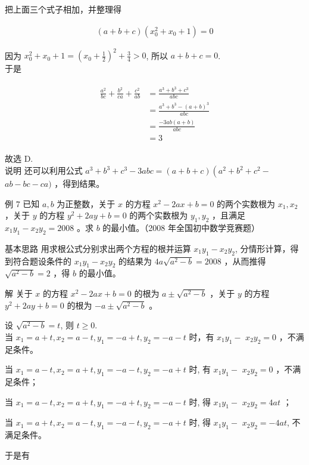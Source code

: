 \documentclass[10pt]{article}
\begin{document}
把上面三个式子相加，并整理得

\begin{align*}
(a+b+c)\left(x_{0}^{2}+x_{0}+1\right)=0
\end{align*}

因为 $x_{0}^{2}+x_{0}+1=\left(x_{0}+\frac{1}{2}\right)^{2}+\frac{3}{4}>0$, 所以 $a+b+c=0$.\\
于是

\begin{align*}
\begin{aligned}
\frac{a^{2}}{b c}+\frac{b^{2}}{c a}+\frac{c^{2}}{a b} & =\frac{a^{3}+b^{3}+c^{3}}{a b c} \\
& =\frac{a^{3}+b^{3}-(a+b)^{3}}{a b c} \\
& =\frac{-3 a b(a+b)}{a b c} \\
& =3
\end{aligned}
\end{align*}

故选 D.\\
说明 还可以利用公式 $a^{3}+b^{3}+c^{3}-3 a b c=(a+b+c)\left(a^{2}+b^{2}+c^{2}-\right.$ $a b-b c-c a)$ ，得到结果。

例 7 已知 $a, b$ 为正整数，关于 $x$ 的方程 $x^{2}-2 a x+b=0$ 的两个实数根为 $x_{1}, x_{2}$ ，关于 $y$ 的方程 $y^{2}+2 a y+b=0$ 的两个实数根为 $y_{1}, y_{2}$ ，且满足 $x_{1} y_{1}-x_{2} y_{2}=2008$ 。求 $b$ 的最小值。（2008 年全国初中数学竞赛题）

基本思路 用求根公式分别求出两个方程的根并运算 $x_{1} y_{1}-x_{2} y_{2}$, 分情形计算，得到符合题设条件的 $x_{1} y_{1}-x_{2} y_{2}$ 的结果为 $4 a \sqrt{a^{2}-b}=2008$ ，从而推得 $\sqrt{a^{2}-b}=2$ ，得 $b$ 的最小值。

解 关于 $x$ 的方程 $x^{2}-2 a x+b=0$ 的根为 $a \pm \sqrt{a^{2}-b}$ ，关于 $y$ 的方程 $y^{2}+2 a y+b=0$ 的根为 $-a \pm \sqrt{a^{2}-b}$ 。

设 $\sqrt{a^{2}-b}=t$, 则 $t \geqslant 0$.\\
当 $x_{1}=a+t, x_{2}=a-t, y_{1}=-a+t, y_{2}=-a-t$ 时，有 $x_{1} y_{1}-$ $x_{2} y_{2}=0$ ，不满足条件。

当 $x_{1}=a-t, x_{2}=a+t, y_{1}=-a-t, y_{2}=-a+t$ 时, 有 $x_{1} y_{1}-$ $x_{2} y_{2}=0$ ，不满足条件；

当 $x_{1}=a-t, x_{2}=a+t, y_{1}=-a+t, y_{2}=-a-t$ 时, 得 $x_{1} y_{1}-$ $x_{2} y_{2}=4 a t$ ；

当 $x_{1}=a+t, x_{2}=a-t, y_{1}=-a-t, y_{2}=-a+t$ 时, 得 $x_{1} y_{1}-$ $x_{2} y_{2}=-4 a t$, 不满足条件。

于是有
\end{document}
